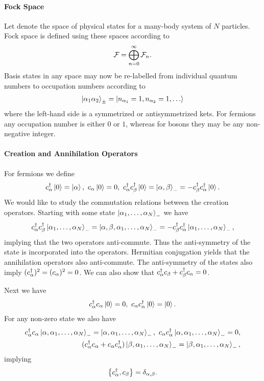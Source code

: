 \paragraph{Fock Space}
Let  denote the space of physical states for a many-body system of $N$ particles. Fock space is defined using these spaces according to
\begin{align*}
	\mathcal{F}_{} = \bigoplus\limits_{n = 0}^{\infty}\mathcal{F}_{n}.
\end{align*}
Basis states in any space  may now be re-labelled from individual quantum numbers to occupation numbers according to
\begin{align*}
	\ket{\alpha_{1}\alpha_{2}}_{\pm} = \ket{n_{\alpha_{1}} = 1, n_{\alpha_{2}} = 1, \dots}
\end{align*}
where the left-hand side is a symmetrized or antisymmetrized kets. For fermions any occupation number is either $0$ or $1$, whereas for bosons they may be any non-negative integer.

\paragraph{Creation and Annihilation Operators}
For fermions we define
\begin{align*}
	\adj{c_{\alpha}}\ket{0} = \ket{\alpha},\ c_{\alpha}\ket{0} = 0,\ \adj{c_{\alpha}}\adj{c_{\beta}}\ket{0} = \ket{\alpha, \beta}_{-} = -\adj{c_{\beta}}\adj{c_{\alpha}}\ket{0}.
\end{align*}
We would like to study the commutation relations between the creation operators. Starting with some state $\ket{\alpha_{1}, \dots, \alpha_{N}}_{-}$ we have
\begin{align*}
	c_{\alpha}^{\dagger}c_{\beta}^{\dagger}\ket{\alpha_{1}, \dots, \alpha_{N}}_{-} = \ket{\alpha, \beta, \alpha_{1}, \dots, \alpha_{N}}_{-} = -c_{\beta}^{\dagger}c_{\alpha}^{\dagger}\ket{\alpha_{1}, \dots, \alpha_{N}}_{-},
\end{align*}
implying that the two operators anti-commute. Thus the anti-symmetry of the state is incorporated into the operators. Hermitian conjugation yields that the annihilation operators also anti-commute. The anti-symmetry of the states also imply $(c_{\alpha}^{\dagger})^{2} = (c_{\alpha})^{2} = 0$. We can also show that $c_{\alpha}^{\dagger}c_{\beta} + c_{\beta}^{\dagger}c_{\alpha} = 0$.

Next we have
\begin{align*}
	\adj{c_{\alpha}}c_{\alpha}\ket{0} = 0,\ c_{\alpha}\adj{c_{\alpha}}\ket{0} = \ket{0}.
\end{align*}
For any non-zero state we also have
\begin{align*}
	\adj{c_{\alpha}}c_{\alpha}\ket{\alpha, \alpha_{1}, \dots, \alpha_{N}}_{-} = \ket{\alpha, \alpha_{1}, \dots, \alpha_{N}}_{-},\ c_{\alpha}\adj{c_{\alpha}}\ket{\alpha, \alpha_{1}, \dots, \alpha_{N}}_{-} = 0, \\
	(\adj{c_{\alpha}}c_{\alpha} + c_{\alpha}\adj{c_{\alpha}})\ket{\beta, \alpha_{1}, \dots, \alpha_{N}}_{-} = \ket{\beta, \alpha_{1}, \dots, \alpha_{N}}_{-},
\end{align*}
implying
\begin{align*}
	\acomm{\adj{c_{\alpha}}}{c_{\beta}} = \delta_{\alpha, \beta}.
\end{align*}

